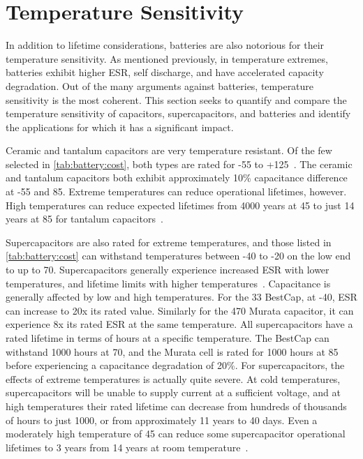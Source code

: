 \section{Temperature Sensitivity}
In addition to lifetime considerations, batteries are also notorious for their temperature sensitivity. As mentioned previously, in temperature extremes, batteries exhibit higher ESR, self discharge, and have accelerated capacity degradation. Out of the many arguments against batteries, temperature sensitivity is the most coherent. This section seeks to quantify and compare the temperature sensitivity of capacitors, supercapacitors, and batteries and identify the applications for which it has a significant impact.

Ceramic and tantalum capacitors are very temperature resistant. Of the few selected in \cref{tab:battery:cost}, both types are rated for -55 to +125\ssi{\celsius}~\cite{ceramicDatasheet,ceramicDatasheet2,tantalumDatasheet}. The ceramic and tantalum capacitors both exhibit approximately 10\% capacitance difference at -55 and 85\ssi{\celsius}. Extreme temperatures can reduce operational lifetimes, however. High temperatures can reduce expected lifetimes from 4000 years at 45\ssi{\celsius} to just 14 years at 85\ssi{\celsius} for tantalum capacitors~\cite{kemetLife}.

Supercapacitors are also rated for extreme temperatures, and those listed in \cref{tab:battery:cost} can withstand temperatures between -40 to -20\ssi{\celsius} on the low end to up to 70\ssi{\celsius}. Supercapacitors generally experience increased ESR with lower temperatures, and lifetime limits with higher temperatures~\cite{murataCap,bestCap,kreczanik2013study,murataTech}. Capacitance is generally affected by low and high temperatures. For the 33\ssi{\milli\farad} BestCap, at -40\ssi{\celsius}, ESR can increase to 20x its rated value. Similarly for the 470\ssi{\milli\farad} Murata capacitor, it can experience 8x its rated ESR at the same temperature. All supercapacitors have a rated lifetime in terms of hours at a specific temperature. The BestCap can withstand 1000 hours at 70\ssi{\celsius}, and the Murata cell is rated for 1000 hours at 85\ssi{\celsius} before experiencing a capacitance degradation of 20\%. For supercapacitors, the effects of extreme temperatures is actually quite severe. At cold temperatures, supercapacitors will be unable to supply current at a sufficient voltage, and at high temperatures their rated lifetime can decrease from hundreds of thousands of hours to just 1000, or from approximately 11 years to 40 days. Even a moderately high temperature of 45\ssi{\celsius} can reduce some supercapacitor operational lifetimes to 3 years from 14 years at room temperature~\cite{kreczanik2013study}.

